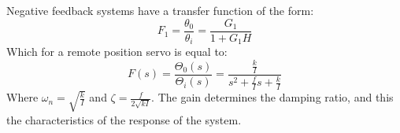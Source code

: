 \documentclass[class=report, crop=false, 12pt,a4paper]{standalone}
\begin{document}
Negative feedback systems have a transfer function of the form:
\begin{equation}
  F_1 = \frac{\theta_0}{\theta_i} = \frac{G_1}{1 + G_1 H}
\end{equation}
Which for a remote position servo is equal to:
\begin{equation}
  F(s) = \frac{\Theta_0 (s)}{\Theta_i (s)} = \frac{\frac{k}{I}}{s^2 + \frac{f}{I}s + \frac{k}{I}}
\end{equation}
Where $\omega_n = \sqrt{\frac{k}{I}}$ and $\zeta = \frac{f}{2\sqrt{kI}}$. The gain determines the damping ratio, and this the characteristics of the response of the system.
\end{document}
